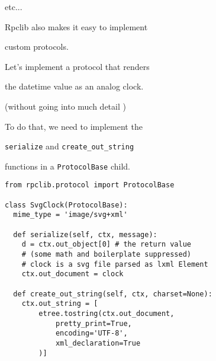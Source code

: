 \documentclass{beamer}
\begin{document}
\begin{frame}
  \LARGE
  \begin{center}
    etc...
  \end{center}
\end{frame}

\begin{frame}
  \LARGE
  \begin{center}
    Rpclib also makes it easy to implement

    \bigskip

    custom protocols.
  \end{center}
\end{frame}

\begin{frame}
  \LARGE
  \begin{center}
    Let's implement a protocol that renders

    \bigskip

    the datetime value as an analog clock.

    \bigskip

    \pause  
    \large
    (without going into much detail \smiley)
  
  \end{center}
\end{frame}

\begin{frame}
  \LARGE
  \begin{center}
    To do that, we need to implement the 

    \bigskip
    
    \texttt{serialize} and \texttt{create\_out\_string}

    \bigskip

    functions in a \texttt{ProtocolBase} child.
  \end{center}
\end{frame}

\begin{frame}[fragile]
  \small
  \begin{lstlisting}
from rpclib.protocol import ProtocolBase

class SvgClock(ProtocolBase):
  mime_type = 'image/svg+xml'

  def serialize(self, ctx, message):
    d = ctx.out_object[0] # the return value
    # (some math and boilerplate suppressed)
    # clock is a svg file parsed as lxml Element
    ctx.out_document = clock 

  def create_out_string(self, ctx, charset=None):
    ctx.out_string = [
        etree.tostring(ctx.out_document, 
            pretty_print=True,
            encoding='UTF-8', 
            xml_declaration=True
        )]
  \end{lstlisting}
\end{frame}
\end{document}
